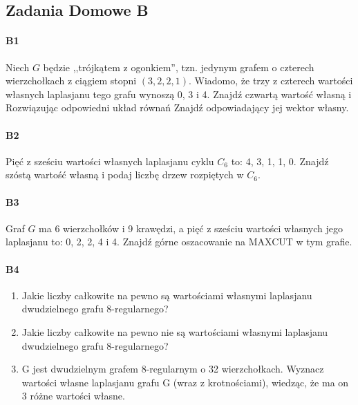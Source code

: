 \subsection{Zadania Domowe B}
\paragraph{B1} Niech $G$ będzie ,,trójkątem z ogonkiem”, tzn. jedynym grafem o czterech wierzchołkach z ciągiem stopni $(3, 2, 2, 1)$. Wiadomo, że trzy z czterech wartości własnych laplasjanu tego grafu wynoszą 0, 3 i 4. Znajdź czwartą wartość własną i Rozwiązując odpowiedni układ równań Znajdź odpowiadający jej wektor własny.

\paragraph{B2} Pięć z sześciu wartości własnych laplasjanu cyklu $C_6$ to: 4, 3, 1, 1, 0. Znajdź szóstą wartość własną i podaj liczbę drzew rozpiętych w $C_6$.

\paragraph{B3} Graf $G$ ma 6 wierzchołków i 9 krawędzi, a pięć z sześciu wartości własnych jego laplasjanu to: 0, 2, 2, 4 i 4. Znajdź górne oszacowanie na MAXCUT w tym grafie.

\paragraph{B4}
\begin{enumerate}[label=\alph*)]
\item Jakie liczby całkowite na pewno są wartościami własnymi laplasjanu dwudzielnego grafu 8-regularnego?
\item Jakie liczby całkowite na pewno nie są wartościami własnymi laplasjanu dwudzielnego grafu 8-regularnego?
\item G jest dwudzielnym grafem 8-regularnym o 32 wierzchołkach. Wyznacz wartości własne laplasjanu grafu G (wraz z krotnościami), wiedząc, że ma on 3 różne wartości własne.
\end{enumerate}

